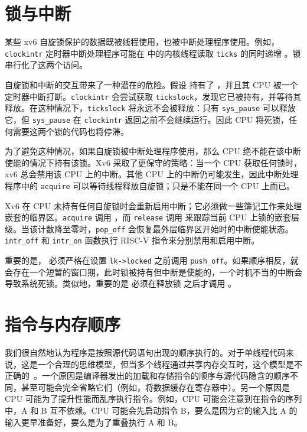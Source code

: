 \section{锁与中断}
\label{s:lockinter}

某些 xv6 自旋锁保护的数据既被线程使用，也被中断处理程序使用。例如，\lstinline{clockintr} 定时器中断处理程序可能在   中的内核线程读取 \lstinline{ticks} 的同时递增  。锁  串行化了这两个访问。

自旋锁和中断的交互带来了一种潜在的危险。假设  持有了 ，并且其 CPU 被一个定时器中断打断。\lstinline{clockintr} 会尝试获取 \lstinline{tickslock}，发现它已被持有，并等待其释放。在这种情况下，\lstinline{tickslock} 将永远不会被释放：只有 \lstinline{sys_pause} 可以释放它，但 \lstinline{sys_pause} 在 \lstinline{clockintr} 返回之前不会继续运行。因此 CPU 将死锁，任何需要这两个锁的代码也将停滞。

为了避免这种情况，如果自旋锁被中断处理程序使用，那么 CPU 绝不能在该中断使能的情况下持有该锁。Xv6 采取了更保守的策略：当一个 CPU 获取任何锁时，xv6 总会禁用该 CPU 上的中断。其他 CPU 上的中断仍可能发生，因此中断处理程序中的 \lstinline{acquire} 可以等待线程释放自旋锁；只是不能在同一个 CPU 上而已。

Xv6 在 CPU 未持有任何自旋锁时会重新启用中断；它必须做一些簿记工作来处理嵌套的临界区。\lstinline{acquire} 调用  ，而 \lstinline{release} 调用   来跟踪当前 CPU 上锁的嵌套层级。当该计数降至零时，\lstinline{pop_off} 会恢复最外层临界区开始时的中断使能状态。\lstinline{intr_off} 和 \lstinline{intr_on} 函数执行 RISC-V 指令来分别禁用和启用中断。

重要的是， 必须严格在设置 \lstinline{lk->locked}  之前调用 \lstinline{push_off}。如果顺序相反，就会存在一个短暂的窗口期，此时锁被持有但中断是使能的，一个时机不当的中断会导致系统死锁。类似地，重要的是  必须在释放锁  之后才调用 。

\section{指令与内存顺序}

我们很自然地认为程序是按照源代码语句出现的顺序执行的。对于单线程代码来说，这是一个合理的思维模型，但当多个线程通过共享内存交互时，这个模型是不正确的~\cite{riscv:user,boehm04}。一个原因是编译器发出的加载和存储指令的顺序与源代码隐含的顺序不同，甚至可能会完全省略它们（例如，将数据缓存在寄存器中）。另一个原因是 CPU 可能为了提升性能而乱序执行指令。例如，CPU 可能会注意到在指令的序列中，A 和 B 互不依赖。CPU 可能会先启动指令 B，要么是因为它的输入比 A 的输入更早准备好，要么是为了重叠执行 A 和 B。

